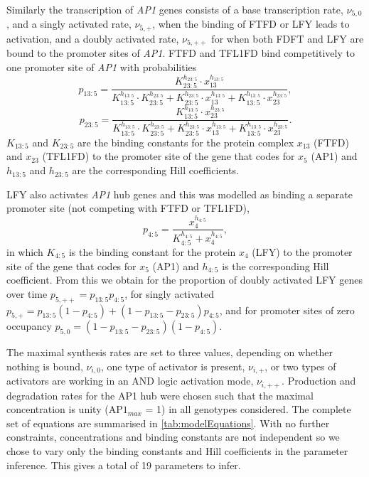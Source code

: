 Similarly the transcription of \emph{AP1} genes consists of a base transcription rate, $\nu_{5,0}$, and a singly activated rate,  $\nu_{5,+}$, when the binding of FTFD or LFY leads to activation, and a doubly activated rate, $\nu_{5,++}$ for when both FDFT and LFY are bound to the promoter sites of \emph{AP1}. FTFD and TFL1FD bind competitively to one promoter site of \emph{AP1} with probabilities 
%
\begin{equation*}
p_{13:5} = \frac{K_{23:5}^{h_{23:5}} \cdot x_{13}^{h_{13:5}}}
{K_{13:5}^{h_{13:5}} \cdot K_{23:5}^{h_{23:5}}+ K_{23:5}^{h_{23:5}} \cdot x_{13}^{h_{13:5}}
+ K_{13:5}^{h_{13:5}} \cdot x_{23}^{h_{23:5}}},
\end{equation*}
%
 \begin{equation*}
p_{23:5} = \frac{K_{13:5}^{h_{13:5}} \cdot x_{23}^{h_{23:5}}}
{K_{13:5}^{h_{13:5}} \cdot K_{23:5}^{h_{23:5}}+ K_{23:5}^{h_{23:5}} \cdot x_{13}^{h_{13:5}}
+ K_{13:5}^{h_{13:5}} \cdot x_{23}^{h_{23:5}}}. 
\end{equation*}
$K_{13:5}$ and $K_{23:5}$ are the binding constants for the protein complex $x_{13}$ (FTFD) and $x_{23}$ (TFL1FD) to the promoter site of the gene that codes for $x_5$ (AP1) and $h_{13:5}$ and $h_{23:5}$ are the corresponding Hill coefficients. 

LFY also activates \emph{AP1} hub genes and this was modelled as binding a separate promoter site (not competing with FTFD or TFL1FD), 
%
\begin{equation}
p_{4:5} = \frac{x_{4}^{h_{4:5}}}{K_{4:5}^{h_{4:5}}+x_{4}^{h_{4:5}}}, 
\end{equation}
%
in which $K_{4:5}$ is the binding constant for the protein $x_{4}$ (LFY) to the promoter site of the gene that codes for $x_5$ (AP1) and $h_{4:5}$ is the corresponding Hill coefficient. 
From this we obtain for the proportion of doubly activated LFY genes over time $p_{5,++} = p_{13:5} p_{4:5}$, for singly activated $p_{5,+} = p_{13:5} (1-p_{4:5}) + (1-p_{13:5} - p_{23:5}) p_{4:5}$, and for promoter sites of zero occupancy $p_{5,0} = (1-p_{13:5} - p_{23:5}) (1 - p_{4:5})$. 

The maximal synthesis rates are set to three values, depending on whether nothing is bound, $\nu_{i,0}$, one type of activator is present, $\nu_{i,+}$, or two types of activators are working in an AND logic activation mode, $\nu_{i,++}$. 
Production and degradation rates for the AP1 hub were chosen such that the maximal concentration is unity ($\mathrm{AP1}_{max}$ = 1) in all genotypes considered.
The complete set of equations are summarised in \autoref{tab:modelEquations}.
With no further constraints, concentrations and binding constants are not independent so we chose to vary only the binding constants and Hill coefficients in the parameter inference.
This gives a total of 19 parameters to infer.

